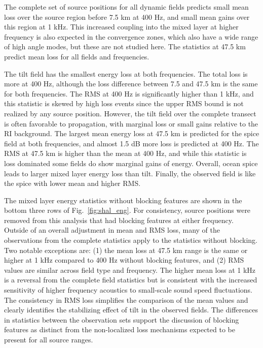 \documentclass[preprint,NumberedRefs]{JASA}
\begin{document}
The complete set of source positions for all dynamic fields predicts small mean loss over the source region before 7.5 km at 400 Hz, and small mean gains over this region at 1 kHz. This increased coupling into the mixed layer at higher frequency is also expected in the convergence zones, which also have a wide range of high angle modes, but these are not studied here. The statistics at 47.5 km predict mean loss for all fields and frequencies.

The tilt field has the smallest energy loss at both frequencies. The total loss is more at 400 Hz, although the loss difference between 7.5 and 47.5 km is the same for both frequencies. The RMS at 400 Hz is significantly higher than 1 kHz, and this statistic is skewed by high loss events since the upper RMS bound is not realized by any source position. However, the tilt field over the complete transect is often favorable to propagation, with marginal loss or small gains relative to the RI background. The largest mean energy loss at 47.5 km is predicted for the spice field at both frequencies, and almost 1.5 dB more loss is predicted at 400 Hz. The RMS at 47.5 km is higher than the mean at 400 Hz, and while this statistic is loss dominated some fields do show marginal gains of energy. Overall, ocean spice leads to larger mixed layer energy loss than tilt. Finally, the observed field is like the spice with lower mean and higher RMS.

The mixed layer energy statistics without blocking features are shown in the bottom three rows of Fig.~\ref{fig:shal_eng}. For consistency, source positions were removed from this analysis that had blocking features at either frequency. Outside of an overall adjustment in mean and RMS loss, many of the observations from the complete statistics apply to the statistics without blocking. Two notable exceptions are: (1) the mean loss at 47.5 km range is the same or higher at 1 kHz compared to 400 Hz without blocking features, and (2) RMS values are similar across field type and frequency. The higher mean loss at 1 kHz is a reversal from the complete field statistics but is consistent with the increased sensitivity of higher frequency acoustics to small-scale sound speed fluctuations. The consistency in RMS loss simplifies the comparison of the mean values and clearly identifies the stabilizing effect of tilt in the observed fields. The differences in statistics between the observation sets support the discussion of blocking features as distinct from the non-localized loss mechanisms expected to be present for all source ranges.
\end{document}
